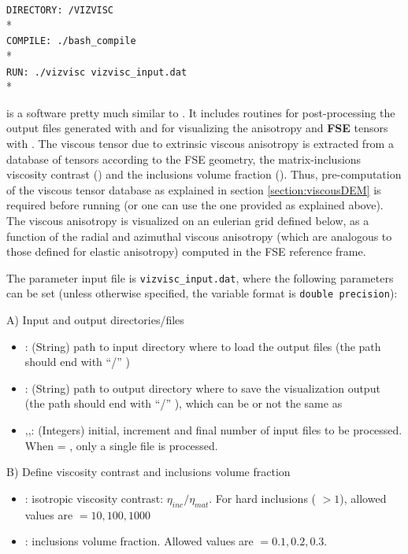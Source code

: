 \texttt{DIRECTORY: /VIZVISC}\\*
\\
\texttt{COMPILE: ./bash\_compile}\\*
\\
\texttt{RUN: ./vizvisc vizvisc\_input.dat}\\*

\vizvisctitle{} is a software pretty much similar to \viztomotitle{}. It includes routines for post-processing the \cijkltitle{} output files generated with \drexmtitle{} and for visualizing the \pmb{$\eta$} anisotropy and \textbf{FSE} tensors with \paraviewtitle{}. The viscous tensor \pmb{$\eta$} due to extrinsic viscous anisotropy is extracted from a database of tensors according to the FSE geometry, the matrix-inclusions viscosity contrast () and the inclusions volume fraction (). Thus, pre-computation of the viscous tensor database as explained in section \ref{section:viscousDEM} is required before running \vizvisctitle{} (or one can use the one provided as explained above). The viscous anisotropy is visualized on an eulerian grid defined below, as a function of the radial and azimuthal viscous anisotropy (which are analogous to those defined for elastic anisotropy) computed in the FSE reference frame.

The parameter input file is \texttt{vizvisc\_input.dat}, where the following parameters can be set (unless otherwise specified, the variable format is \texttt{double precision}): 

A) Input and output directories/files
\begin{itemize}
    \item {}: (String) path to input directory where to load the \drexmtitle{} \cijkltitle{} output files (the path should end with  “/” )
	\item {}: (String) path to output directory where to save the visualization output (the path should end with  “/” ), which can be or not the same as 
	\item {},,: (Integers) initial, increment and final number of input \cijkltitle{} files to be processed. When  = , only a single \cijkltitle{} file is processed.
\end{itemize}

B) Define viscosity contrast and inclusions volume fraction
\begin{itemize}
    \item {}: isotropic viscosity contrast: $\eta_{inc}/\eta_{mat}$. For hard inclusions ( $ > 1$), allowed values are $ = 10, 100, 1000$ 
	\item {}: inclusions volume fraction. Allowed values are  $= 0.1, 0.2, 0.3$.
\end{itemize}

